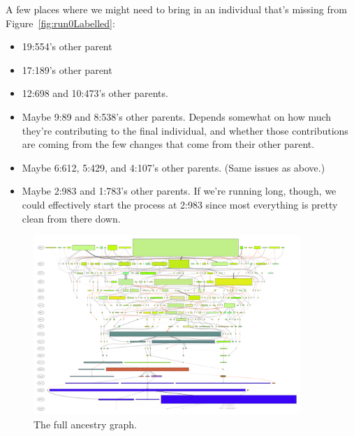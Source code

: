 A few places where we might need to bring in an individual that's 
missing from Figure~\ref{fig:run0Labelled}:
\begin{itemize}
	\item 19:554's other parent
	\item 17:189's other parent
	\item 12:698 and 10:473's other parents.
	\item Maybe 9:89 and 8:538's other parents. Depends somewhat on how much
	they're contributing to the final individual, and whether those 
	contributions are coming from the few changes that come from their other
	parent.
	\item Maybe 6:612, 5:429, and 4:107's other parents. (Same issues as above.)
	\item Maybe 2:983 and 1:783's other parents. If we're running long, though, 
	we could effectively start the process at 2:983 since most everything is
	pretty clean from there down.
\end{itemize}


\begin{figure}[tb!p] %
	\begin{center}
		\includegraphics[width=0.9\textwidth]{../figures/run0_RBM_color_full_30000}
	\end{center}
	\caption{The full ancestry graph.}
	\label{fig:run0full}       %
\end{figure}

